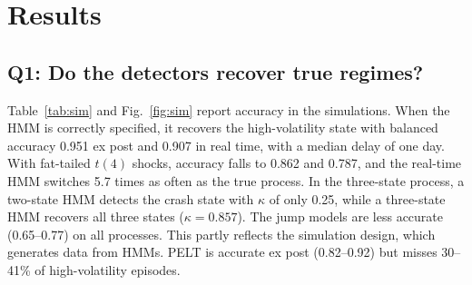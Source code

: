 \documentclass[conference]{IEEEtran}
\begin{document}
\section{Results}

\subsection{Q1: Do the detectors recover true regimes?}
Table~\ref{tab:sim} and Fig.~\ref{fig:sim} report accuracy in the simulations. When the HMM is correctly specified, it recovers the high-volatility state with balanced accuracy 0.951 ex post and 0.907 in real time, with a median delay of one day. With fat-tailed $t(4)$ shocks, accuracy falls to 0.862 and 0.787, and the real-time HMM switches 5.7 times as often as the true process. In the three-state process, a two-state HMM detects the crash state with $\kappa$ of only 0.25, while a three-state HMM recovers all three states ($\kappa = 0.857$). The jump models are less accurate (0.65--0.77) on all processes. This partly reflects the simulation design, which generates data from HMMs. PELT is accurate ex post (0.82--0.92) but misses 30--41\% of high-volatility episodes.

\begin{table}[t]
\centering
\caption{Simulation: Recovery of the High-Volatility State (Mean of 100 Replications; PELT 25)}
\label{tab:sim}
\footnotesize
\setlength{\tabcolsep}{3pt}
\end{table}
\end{document}
